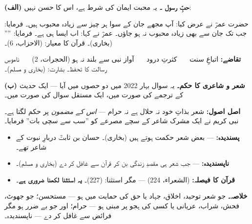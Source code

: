 \begin{hal}
\textbf{(الف) حبِّ رسول \saw۔} یہ محبت ایمان کی شرط ہے، اس کا حسن نہیں:


\smallskip
حضرت عمرؓ نے عرض کیا: آپ مجھے جان کے سوا ہر چیز سے زیادہ محبوب ہیں۔ فرمایا:
جب تک جان سے بھی زیادہ محبوب نہ ہو جاؤں۔ عمرؓ نے کہا: اب ایسا ہی ہے۔ فرمایا:
'''' (بخاری)۔ قرآن کا معیار:  (الاحزاب، \textenglish{6})۔

\smallskip
\textbf{تقاضے:} اتباعِ سنت \ \textbullet\ \ کثرتِ درود \ \textbullet\ \ آواز نبی
\saw سے بلند نہ ہو (الحجرات، \textenglish{2}) \ \textbullet\ \ ناموسِ رسالت کا
تحفظ۔ بشارت:  (بخاری و مسلم)۔

\medskip
\textbf{(ب) شعر و شاعری کا حکم۔} یہ سوال بہار \textenglish{2022} میں دو حصوں
میں آیا --- ایک حدیث کے ترجمے کی صورت میں، ایک مستقل سوال کی صورت میں۔


\smallskip
\textbf{اصل اصول:} شعر بذاتِ خود نہ حلال ہے نہ حرام --- \emph{اس کے مضمون} پر
حکم لگتا ہے۔ نبی کریم \saw نے ایک مشرک شاعر کے سچے مصرعے کو ''سب سے سچی بات''
فرمایا۔

\begin{itemize}\setlength{\itemsep}{1pt}
  \item \textbf{پسندیدہ:}  --- بعض شعر
        حکمت ہوتے ہیں (بخاری)۔ حسان بن ثابتؓ دربارِ نبوت کے شاعر تھے۔
  \item \textbf{ناپسندیدہ:}  --- جب شعر ہی مقصدِ زندگی بن
        کر قرآن سے غافل کر دے (بخاری و مسلم)۔
  \item \textbf{قرآن کا فیصلہ:} 
        (الشعراء، \textenglish{224}) --- مگر استثنا:  (\textenglish{227})۔ \textbf{یہ
        استثنا لکھنا ضروری ہے}۔
\end{itemize}

\medskip
\textbf{خلاصہ۔} جو شعر توحید، اخلاق، جہاد یا حق کی حمایت میں ہو --- مستحسن؛ جو
جھوٹ، فحش، شراب، عریانی یا کسی کی ہجو پر مبنی ہو --- حرام؛ اور جو بے ضرر ہو مگر
فرائض سے غافل کر دے --- ناپسندیدہ۔
\end{hal}
